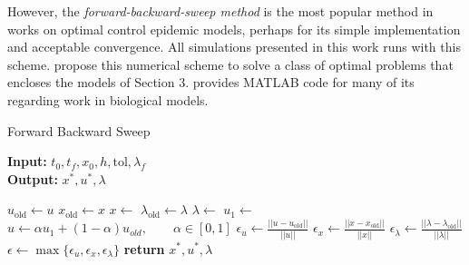   However, the {\it forward-backward-sweep method} is the most popular method in 
works on optimal control epidemic models, perhaps for its simple 
implementation and acceptable convergence. All simulations presented in this work runs with 
this scheme. \citet{hackbusch1978numerical} propose this numerical scheme to 
solve a class of optimal problems that encloses the models of Section 3.
\citet{lenhart2007optimal} provides MATLAB code for many of its regarding
work in biological models.

\begin{algorithm}
  \caption{Forward Backward Sweep } \label{alg:forward_backward_sweep}
  \begin{flushleft}
    \hspace*{\algorithmicindent} \textbf{Input:} 
    $t_0, t_f, x_0,h, \text{tol}, \lambda_{f}$ \\
    \hspace*{\algorithmicindent} \textbf{Output:} 
    $x^*, u^*, \lambda$
  \end{flushleft}
  \begin{algorithmic}
      \State $u_{\text{old}} \gets u$ 
      \State $x_{\text{old}} \gets x$ 
      \State $ x \gets$
      \State $\lambda_{\text{old}} \gets \lambda $
      \State $\lambda \gets$ 
      \State $u_1 \gets$ 
      \State 
        $u \gets \alpha u_1 + (1-\alpha)u_{old}, 
        \qquad \alpha \in [0, 1]$
      \State 
      $\epsilon_u \gets \displaystyle 
        \frac{||u - u_{\text{old}}||}{||u||}$
      \State 
      $\epsilon_x \gets \displaystyle 
        \frac{||x - x_{\text{old}}||}{||x||}$
      \State 
        $\epsilon_{\lambda} \gets \displaystyle 
        \frac{||\lambda - \lambda_{\text{old}}||}{||\lambda||}$
      \State 
        $\epsilon \gets 
        \max{ 
          \{ \epsilon_u, \epsilon_x, \epsilon_{\lambda} \}
       }$
    \EndWhile\label{}
      \State \textbf{return} $ x^*, u^*, \lambda$
    \EndProcedure
  \end{algorithmic}
\end{algorithm}
\medskip  
